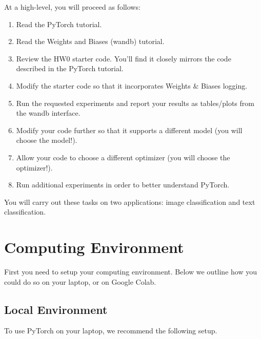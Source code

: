 \documentclass[11pt,addpoints,answers]{exam}
\begin{document}
At a high-level, you will proceed as follows:

\begin{enumerate}
\item Read the PyTorch tutorial.
\item Read the Weights and Biases (wandb) tutorial.
\item Review the HW0 starter code. You'll find it closely mirrors the code described in the PyTorch tutorial.
\item Modify the starter code so that it incorporates Weights \& Biases logging.
\item Run the requested experiments and report your results as tables/plots from the wandb interface.
\item Modify your code further so that it supports a different model (you will choose the model!).
\item Allow your code to choose a different optimizer (you will choose the optimizer!).
\item Run additional experiments in order to better understand PyTorch.
\end{enumerate}

You will carry out these tasks on two applications: image classification and text classification.

\clearpage

\section*{Computing Environment}
\label{sec:env}

First you need to setup your computing environment. Below we outline how you could do so on your laptop, or on Google Colab.

\subsection*{Local Environment}
\label{sec:local}

To use PyTorch on your laptop, we recommend the following setup.
\end{document}
